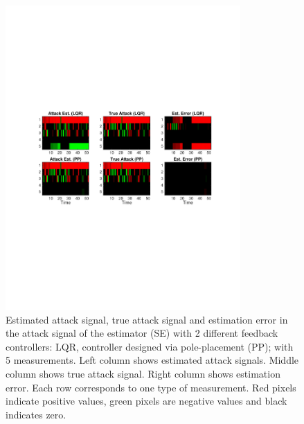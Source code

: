 \documentclass[../../thesis.tex]{subfiles}
\begin{document}
\begin{figure}
\center
\includegraphics[width=0.8\textwidth]{chapters/se_linear/figures/qh/uav_pp_error.pdf}
\caption{Estimated attack signal, true attack signal and estimation error in the attack signal of the estimator (SE) with 2 different feedback controllers: LQR, controller designed via pole-placement (PP); with 5 measurements. Left column shows estimated attack signals. Middle column shows true attack signal. Right column shows estimation error. Each row corresponds to one type of measurement. Red pixels indicate positive values, green pixels are negative values and black indicates zero. }
\label{fig:ex_pp_err}
\end{figure}
\end{document}
